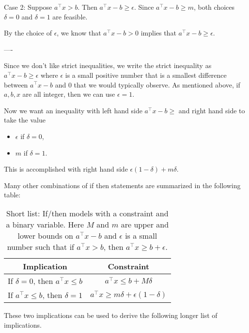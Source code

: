 \documentclass[../open-optimization/open-optimization.tex]{subfiles}
\begin{document}
Case 2:  Suppose $a^\top x > b$.  Then $a^\top x - b \geq \epsilon$.    Since $a^\top x -b \geq m$, both choices $\delta = 0$ and $\delta = 1$ are feasible.

By the choice of $\epsilon$,  we know that $a^\top x -b > 0$ implies that $a^\top x - b \geq \epsilon$.  



----


Since we don't like strict inequalities, we write the strict inequality as $a^\top x - b \geq \epsilon$ where $\epsilon$ is a small positive number that is a smallest difference between $a^\top x - b$ and $0$ that we would typically observe.  As mentioned above, if $a,b,x$ are all integer, then we can use $\epsilon = 1$.

Now we want an inequality with left hand side $a^\top x - b \geq$ and right hand side to take the value 
\begin{itemize}
\item $\epsilon$ if $\delta = 0$,
\item $m$ if $\delta = 1$.
\end{itemize}
This is accomplished with right hand side $\epsilon (1-\delta) + m\delta$.

Many other combinations of if then statements are summarized in the following table:
\begin{table}
\begin{center}
\begin{tabular}{|c|c|}
\hline
\textbf{Implication} & \textbf{Constraint}\\
\hline
If $\delta = 0$, then $a^\top x \leq b$ & $a^\top x \leq b + M \delta$\\
If $a^\top x \leq b$, then $\delta = 1$ & $a^\top x \geq m \delta + \epsilon(1-\delta)$\\
\hline
\end{tabular}
\end{center}
\caption{Short list: If/then models with a constraint and a binary variable.  Here $M$ and $m$ are upper and lower bounds on $a^\top x - b$ and $\epsilon$ is a small number such that if $a^\top x > b$, then $a^\top x \geq b + \epsilon$.}
\end{table}
These two implications can be used to derive the following longer list of implications.
\end{document}
